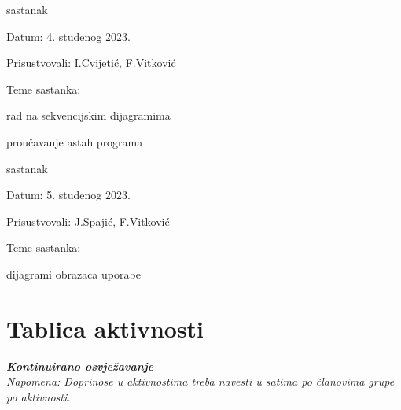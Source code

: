 \begin{packed_enum}
			\item  sastanak
			\item[] \begin{packed_item}
				\item Datum: 4. studenog 2023.
				\item Prisustvovali: I.Cvijetić, F.Vitković
				\item Teme sastanka:
				\begin{packed_item}
					\item  rad na sekvencijskim dijagramima
					\item  proučavanje astah programa
				\end{packed_item}
			\end{packed_item}
			
			\item  sastanak
			\item[] \begin{packed_item}
				\item Datum: 5. studenog 2023.
				\item Prisustvovali: J.Spajić, F.Vitković
				\item Teme sastanka:
				\begin{packed_item}
					\item  dijagrami obrazaca uporabe
				\end{packed_item}
			\end{packed_item}
			
		\end{packed_enum}
		
		
		
		\eject
		\section*{Tablica aktivnosti}
		
			\textbf{\textit{Kontinuirano osvježavanje}}\\
			
			 \textit{Napomena: Doprinose u aktivnostima treba navesti u satima po članovima grupe po aktivnosti.}

